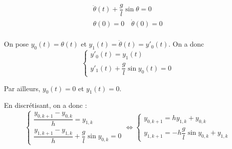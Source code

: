 \normaltrue \difficilefalse \tdifficilefalse
\correctionfalse


\setcounter{question}{0}%
\ifcorrection
\else
{}
\fi



$$
\begin{array}{l}
\ddot{\theta}(t) + \dfrac{g}{l}\sin \theta = 0\\
\theta(0) = 0 \quad \dot{\theta}(0) = 0 \\
\end{array} 
$$


\ifprof
On pose $y_0(t) = \theta(t) $ et $y_1(t) = \dot{\theta}(t) = y'_0(t) $. On a donc 
$$
\left\{
\begin{array}{l}
y'_0(t) = y_1(t) \\
y'_1(t) + \dfrac{g}{l} \sin y_0(t) = 0
\end{array} 
\right.
$$

Par ailleurs, $y_0(t) = 0 $ et $y_1(t) =0$.

En discrétisant, on a donc :
$$
\left\{
\begin{array}{l}
\dfrac{y_{0,k+1}-y_{0,k}}{h} = y_{1,k} \\
\dfrac{y_{1,k+1}-y_{1,k}}{h} + \dfrac{g}{l} \sin y_{0,k} = 0
\end{array} 
\right.
\Longleftrightarrow
\left\{
\begin{array}{l}
y_{0,k+1} = h y_{1,k} + y_{0,k}\\
y_{1,k+1} = - h \dfrac{g}{l} \sin y_{0,k}  + y_{1,k}
\end{array} 
\right.
$$
\else
\fi



 

\ifprof
\else


\fi